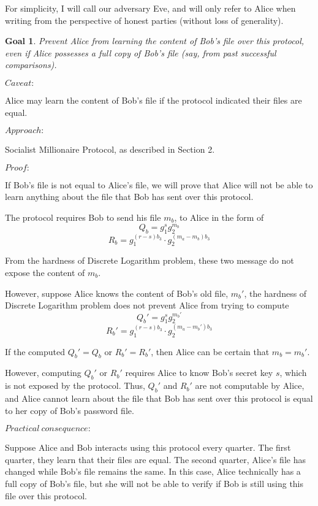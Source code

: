 \documentclass{article}
\newtheorem{goal}{Goal}
\begin{document}
For simplicity, I will call our adversary Eve, and will only refer to Alice
when writing from the perspective of honest parties (without loss of generality).

\begin{goal}
Prevent Alice from learning the content of Bob's file over this protocol, even if 
Alice possesses a full copy of Bob's file (say, from past successful comparisons).
\end{goal}

$Caveat:$ 

Alice may learn the content of Bob's file if the protocol indicated their files 
are equal.

$Approach:$ 

Socialist Millionaire Protocol, as described in Section 2.

$Proof:$

If Bob's file is not equal to Alice's file, we will prove that Alice will not be able 
to learn anything about the file that Bob has sent over this protocol.

The protocol requires Bob to send his file $m_b$, to Alice in the form of 
$$Q_b = g_1^sg_2^{m_b}$$ 
$$R_{b} = g_1^{(r-s)b_3} \cdot g_2^{(m_a-m_b)b_3}$$ 

From the hardness of Discrete Logarithm problem, these two message do not expose the content of 
$m_b$.

However, suppose Alice knows the content of Bob's old file, $m_b'$, the hardness of 
Discrete Logarithm problem does not prevent Alice from trying 
to compute $$Q_b' = g_1^sg_2^{m_b'}$$
$$R_{b}' = g_1^{(r-s)b_3} \cdot g_2^{(m_a-m_b')b_3}$$ 

If the computed $Q_b' = Q_b$ or $R_b' = R_b'$, then Alice can be certain that $m_b = m_b'$.

However, computing $Q_b'$ or $R_b'$ requires Alice to know Bob's secret key $s$, which is 
not exposed by the protocol. Thus, $Q_b'$ and $R_b'$ are not 
computable by Alice, and Alice cannot learn about the file that Bob has sent over 
this protocol is equal to her copy of Bob's password file.

$Practical\ consequence:$

Suppose Alice and Bob interacts using this protocol every quarter. The first quarter,
they learn that their files are equal. The second quarter, Alice's file has changed while
Bob's file remains the same. In this case, Alice technically has a full copy of Bob's file,
but she will not be able to verify if Bob is still using this file over this protocol. 
\end{document}
